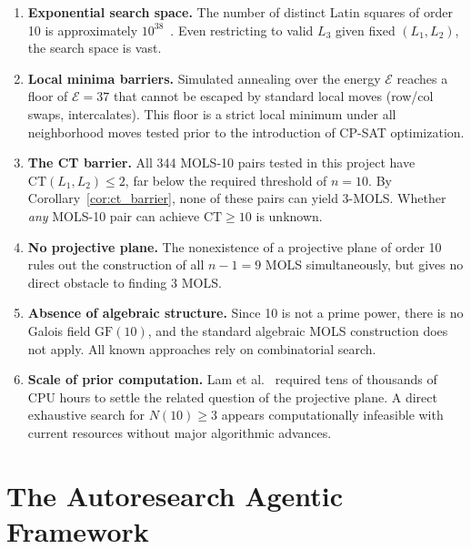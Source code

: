 \documentclass[11pt,a4paper]{article}
\theoremstyle{remark}
\newcommand{\CT}{\mathrm{CT}}
\newcommand{\E}{\mathcal{E}}
\begin{document}
\begin{enumerate}
  \item \textbf{Exponential search space.} The number of distinct Latin squares of order 10
    is approximately $10^{38}$~\cite{mckay2005}. Even restricting to valid $L_3$ given
    fixed $(L_1, L_2)$, the search space is vast.

  \item \textbf{Local minima barriers.} Simulated annealing over the energy $\E$ reaches
    a floor of $\E = 37$ that cannot be escaped by standard local moves (row/col swaps,
    intercalates). This floor is a strict local minimum under all neighborhood moves
    tested prior to the introduction of CP-SAT optimization.

  \item \textbf{The CT barrier.} All 344 MOLS-10 pairs tested in this project have
    $\CT(L_1, L_2) \leq 2$, far below the required threshold of $n = 10$.
    By Corollary~\ref{cor:ct_barrier}, none of these pairs can yield 3-MOLS.
    Whether \emph{any} MOLS-10 pair can achieve $\CT \geq 10$ is unknown.

  \item \textbf{No projective plane.} The nonexistence of a projective plane of order 10
    rules out the construction of all $n-1 = 9$ MOLS simultaneously, but gives no
    direct obstacle to finding 3 MOLS.

  \item \textbf{Absence of algebraic structure.} Since 10 is not a prime power, there is
    no Galois field $\mathrm{GF}(10)$, and the standard algebraic MOLS construction does
    not apply. All known approaches rely on combinatorial search.

  \item \textbf{Scale of prior computation.} Lam et al.~\cite{lam1989} required tens of
    thousands of CPU hours to settle the related question of the projective plane. A
    direct exhaustive search for $N(10) \geq 3$ appears computationally infeasible with
    current resources without major algorithmic advances.
\end{enumerate}

\section{The Autoresearch Agentic Framework}
\label{sec:framework}
\end{document}
